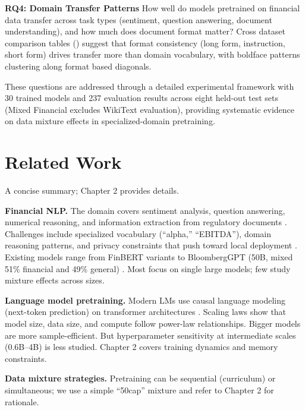 \textbf{RQ4: Domain Transfer Patterns}
How well do models pretrained on financial data transfer across task types (sentiment, question answering, document understanding), and how much does document format matter? Cross dataset comparison tables () suggest that format consistency (long form, instruction, short form) drives transfer more than domain vocabulary, with boldface patterns clustering along format based diagonals.

These questions are addressed through a detailed experimental framework with 30 trained models and 237 evaluation results across eight held-out test sets (Mixed Financial excludes WikiText evaluation), providing systematic evidence on data mixture effects in specialized-domain pretraining.

\section{Related Work}

A concise summary; Chapter 2 provides details.

\textbf{Financial NLP.} The domain covers sentiment analysis, question answering, numerical reasoning, and information extraction from regulatory documents \parencite{araci2019finbert, chen2021finqa}. Challenges include specialized vocabulary (``alpha,'' ``EBITDA''), domain reasoning patterns, and privacy constraints that push toward local deployment \parencite{wu2023bloomberggpt}. Existing models range from FinBERT variants \parencite{araci2019finbert, yang2020finbert} to BloombergGPT (50B, mixed 51\% financial and 49\% general) \parencite{wu2023bloomberggpt}. Most focus on single large models; few study mixture effects across sizes.

\textbf{Language model pretraining.} Modern LMs use causal language modeling (next-token prediction) on transformer architectures \parencite{vaswani2017attention, radford2019language, brown2020language}. Scaling laws \parencite{kaplan2020scaling, hoffmann2022training} show that model size, data size, and compute follow power-law relationships. Bigger models are more sample-efficient. But hyperparameter sensitivity at intermediate scales (0.6B–4B) is less studied. Chapter 2 covers training dynamics and memory constraints.

\textbf{Data mixture strategies.} Pretraining can be sequential (curriculum) or simultaneous; we use a simple “50cap” mixture and refer to Chapter 2 for rationale.

